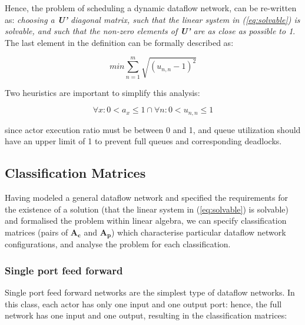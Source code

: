Hence, the problem of scheduling a dynamic dataflow network, can be re-written as: \textit{choosing a \textbf{U'} diagonal matrix, such that the linear system in (\ref{eq:solvable}) is solvable, and such that the non-zero elements of \textbf{U'} are as close as possible to 1}. The last element in the definition can be formally described as:

\begin{equation}
min \sum_{n=1}^{m}{\sqrt{(u_{n,n}-1)^2}}
\end{equation} 

Two heuristics are important to simplify this analysis: 

\begin{equation}
\forall x: 0 < a_x \leq 1 \cap \forall n: 0 < u_{n,n} \leq 1
\end{equation} 


since actor execution ratio must be between 0 and 1, and queue utilization should have an upper limit of 1 to prevent full queues and corresponding deadlocks.


\subsection{Classification Matrices}

Having modeled a general dataflow network and specified the requirements for the existence of a solution (that the linear system in (\ref{eq:solvable}) is solvable) and formalised the problem within linear algebra, we can specify classification matrices (pairs of $\textbf{A}_{\textbf{c}}$ and $\textbf{A}_{\textbf{p}}$) which characterise particular dataflow network configurations, and analyse the problem for each classification.

\subsubsection{Single port feed forward}

Single port feed forward networks are the simplest type of dataflow networks. In this class, each actor has only one input and one output port: hence, the full network has one input and one output, resulting in the classification matrices:

